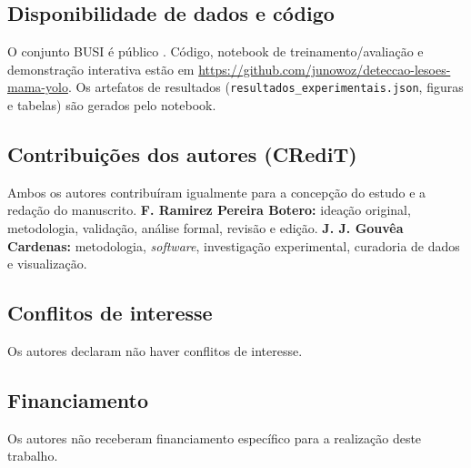 \documentclass[11pt,a4paper]{article}
\begin{document}
\subsection*{Disponibilidade de dados e código}
O conjunto BUSI é público \citep{aldhabyani2020}. Código, notebook de
treinamento/avaliação e demonstração interativa estão em
\url{https://github.com/junowoz/deteccao-lesoes-mama-yolo}. Os artefatos de
resultados (\texttt{resultados\_experimentais.json}, figuras e tabelas) são
gerados pelo notebook.

\subsection*{Contribuições dos autores (CRediT)}
Ambos os autores contribuíram igualmente para a concepção do estudo e a redação do
manuscrito. \textbf{F. Ramirez Pereira Botero:} ideação original, metodologia,
validação, análise formal, revisão e edição. \textbf{J. J. Gouvêa Cardenas:}
metodologia, \textit{software}, investigação experimental, curadoria de dados e
visualização.

\subsection*{Conflitos de interesse}
Os autores declaram não haver conflitos de interesse.

\subsection*{Financiamento}
Os autores não receberam financiamento específico para a realização deste
trabalho.
\end{document}
